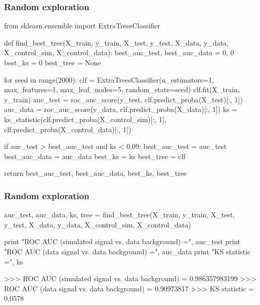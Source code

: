 \documentclass{beamer}
\begin{document}
\begin{frame}[fragile]
  \frametitle{Random exploration}

{\scriptsize
\begin{pythoncode}
from sklearn.ensemble import ExtraTreesClassifier

def find_best_tree(X_train, y_train, X_test, y_test,
                   X_data, y_data, X_control_sim, X_control_data):
    best_auc_test, best_auc_data = 0, 0
    best_ks = 0
    best_tree = None

    for seed in range(2000):
        clf = ExtraTreesClassifier(n_estimators=1, max_features=1,
                                   max_leaf_nodes=5, random_state=seed)
        clf.fit(X_train, y_train)
        auc_test = roc_auc_score(y_test, clf.predict_proba(X_test)[:, 1])
        auc_data = roc_auc_score(y_data, clf.predict_proba(X_data)[:, 1])
        ks = ks_statistic(clf.predict_proba(X_control_sim)[:, 1],
                          clf.predict_proba(X_control_data)[:, 1])

        if auc_test > best_auc_test and ks < 0.09:
            best_auc_test = auc_test
            best_auc_data = auc_data
            best_ks = ks
            best_tree = clf

    return best_auc_test, best_auc_data, best_ks, best_tree
\end{pythoncode}
}

\end{frame}

\begin{frame}[fragile]
  \frametitle{Random exploration}

{\scriptsize
\begin{pythoncode}
auc_test, auc_data, ks, tree = find_best_tree(X_train, y_train,
                                              X_test, y_test,
                                              X_data, y_data,
                                              X_control_sim, X_control_data)

print "ROC AUC (simulated signal vs. data background) =", auc_test
print "ROC AUC (data signal vs. data background) =", auc_data
print "KS statistic =", ks

>>> ROC AUC (simulated signal vs. data background) = 0.986357983199
>>> ROC AUC (data signal vs. data background) = 0.90973817
>>> KS statistic = 0.0578
\end{pythoncode}
}

\end{frame}
\end{document}
